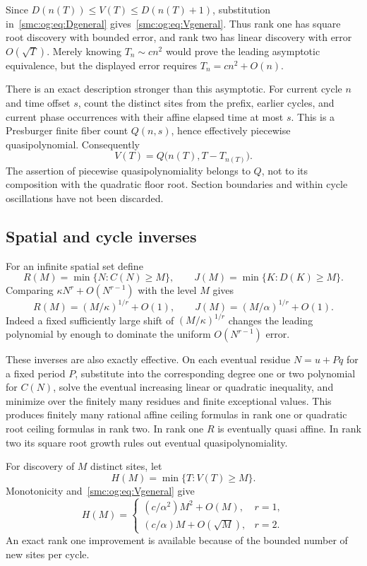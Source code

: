 \documentclass[11pt,letterpaper]{article}
\numberwithin{equation}{section}
\theoremstyle{definition}
\theoremstyle{remark}
\begin{document}
Since $D(n(T))\le V(T)\le D(n(T)+1)$, substitution in~\eqref{smc:og:eq:Dgeneral} gives~\eqref{smc:og:eq:Vgeneral}. Thus rank one has square root discovery with bounded error, and rank two has linear discovery with error $O(\sqrt T)$. Merely knowing $T_n\sim cn^2$ would prove the leading asymptotic equivalence, but the displayed error requires $T_n=cn^2+O(n)$.

There is an exact description stronger than this asymptotic. For current cycle $n$ and time offset $s$, count the distinct sites from the prefix, earlier cycles, and current phase occurrences with their affine elapsed time at most $s$. This is a Presburger finite fiber count $Q(n,s)$, hence effectively piecewise quasipolynomial. Consequently
\begin{equation}\label{smc:og:eq:exactQ}
 V(T)=Q\bigl(n(T),T-T_{n(T)}\bigr).
\end{equation}
The assertion of piecewise quasipolynomiality belongs to $Q$, not to its composition with the quadratic floor root. Section boundaries and within cycle oscillations have not been discarded.

\subsection{Spatial and cycle inverses}
For an infinite spatial set define
\[
 R(M)=\min\{N:C(N)\ge M\},\qquad
 J(M)=\min\{K:D(K)\ge M\}.
\]
Comparing $\kappa N^r+O(N^{r-1})$ with the level $M$ gives
\begin{equation}\label{smc:og:eq:spatialinverse}
 R(M)=(M/\kappa)^{1/r}+O(1),\qquad
 J(M)=(M/\alpha)^{1/r}+O(1).
\end{equation}
Indeed a fixed sufficiently large shift of $(M/\kappa)^{1/r}$ changes the leading polynomial by enough to dominate the uniform $O(N^{r-1})$ error.

These inverses are also exactly effective. On each eventual residue $N=u+Pq$ for a fixed period $P$, substitute into the corresponding degree one or two polynomial for $C(N)$, solve the eventual increasing linear or quadratic inequality, and minimize over the finitely many residues and finite exceptional values. This produces finitely many rational affine ceiling formulas in rank one or quadratic root ceiling formulas in rank two. In rank one $R$ is eventually quasi affine. In rank two its square root growth rules out eventual quasipolynomiality.

For discovery of $M$ distinct sites, let
\[
 H(M)=\min\{T:V(T)\ge M\}.
\]
Monotonicity and~\eqref{smc:og:eq:Vgeneral} give
\begin{equation}\label{smc:og:eq:Hgeneral}
 H(M)=
 \begin{cases}
 (c/\alpha^2)M^2+O(M),&r=1,\\
 (c/\alpha)M+O(\sqrt M),&r=2.
 \end{cases}
\end{equation}
An exact rank one improvement is available because of the bounded number of new sites per cycle.
\end{document}

